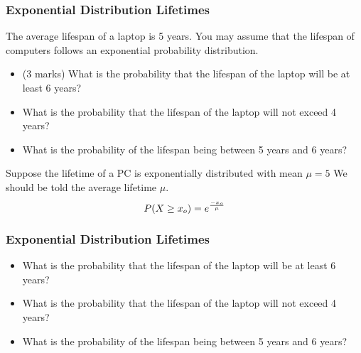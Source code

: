 


\begin{frame}
\frametitle{Exponential Distribution Lifetimes}
The average lifespan of a laptop is 5 years. You may assume that
the lifespan of computers follows an exponential probability
distribution. \begin{itemize}\item (3 marks) What is the
probability that the lifespan of the laptop will be at least 6
years? \item
What is the probability that the lifespan of the laptop will not
exceed 4 years? \item What is the probability of the
lifespan being between 5 years and 6 years?
\end{itemize}
Suppose the lifetime of a PC is exponentially distributed with
mean $\mu =5$
We should be told the average lifetime $\mu$.
\[
P( X \geq x_o) = e^{{-x_o \over \mu}}
\]
\end{frame}

\begin{frame}
	\frametitle{Exponential Distribution Lifetimes}

\begin{itemize}
\item What is the probability that the lifespan of the laptop will be at least
6 years?
\item What is the probability that the lifespan of the laptop will not exceed
4 years?
\item What is the probability of the lifespan being between 5 years and 6
years?
\end{itemize}

\end{frame}


